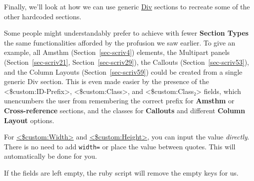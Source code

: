 \documentclass[
  12pt,
  a4paper,
  oneside,
  numbers=noenddot,
  titlepage,
  toclink=all,
  toc=bibliography]{scrbook}
\theoremstyle{definition}
\theoremstyle{definition}
\theoremstyle{definition}
\theoremstyle{plain}
\theoremstyle{plain}
\theoremstyle{plain}
\theoremstyle{plain}
\theoremstyle{plain}
\theoremstyle{remark}
\begin{document}
Finally, we'll look at how we can use generic \ul{Div} sections to
recreate some of the other hardcoded sections.

Some people might understandably prefer to achieve with fewer
\textbf{Section Types} the same functionalities afforded by the
profusion we saw earlier. To give an example, all Amsthm
(\protect\hypertarget{cite_109}{}{\label{cite_109}Section~\ref{sec-scriv4}})
elements, the Multipart panels
(\protect\hypertarget{cite_110}{}{\label{cite_110}Section~\ref{sec-scriv21}},
\protect\hypertarget{cite_111}{}{\label{cite_111}Section~\ref{sec-scriv29}}),
the Callouts
(\protect\hypertarget{cite_112}{}{\label{cite_112}Section~\ref{sec-scriv53}}),
and the Column Layouts
(\protect\hypertarget{cite_113}{}{\label{cite_113}Section~\ref{sec-scriv59}})
could be created from a single generic Div section. This is even made
easier by the presence of the \textless\$custom:ID-Prefix\textgreater,
\textless\$custom:Class\textgreater, and
\textless\$custom:Class₂\textgreater{} fields, which unencumbers the
user from remembering the correct prefix for \textbf{Amsthm} or
\textbf{Cross-reference} sections, and the classes for \textbf{Callouts}
and different \textbf{Column Layout} options.

\begin{tcolorbox}[enhanced jigsaw, titlerule=0mm, left=2mm, toptitle=1mm, colback=white, coltitle=black, rightrule=.15mm, arc=.35mm, title=\textcolor{quarto-callout-tip-color}{\faLightbulb}\hspace{0.5em}{Tip}, colframe=quarto-callout-tip-color-frame, bottomrule=.15mm, colbacktitle=quarto-callout-tip-color!10!white, toprule=.15mm, breakable, bottomtitle=1mm, opacityback=0, opacitybacktitle=0.6, leftrule=.75mm]

For \ul{\textless\$custom:Width\textgreater{}} and
\ul{\textless\$custom:Height\textgreater{}}, you can input the value
\emph{directly}. There is no need to add \texttt{width=} or place the
value between quotes. This will automatically be done for you.

\end{tcolorbox}

\begin{tcolorbox}[enhanced jigsaw, titlerule=0mm, left=2mm, toptitle=1mm, colback=white, coltitle=black, rightrule=.15mm, arc=.35mm, title=\textcolor{quarto-callout-note-color}{\faInfo}\hspace{0.5em}{Note}, colframe=quarto-callout-note-color-frame, bottomrule=.15mm, colbacktitle=quarto-callout-note-color!10!white, toprule=.15mm, breakable, bottomtitle=1mm, opacityback=0, opacitybacktitle=0.6, leftrule=.75mm]

If the fields are left empty, the ruby script will remove the empty keys
for us.

\end{tcolorbox}
\end{document}
